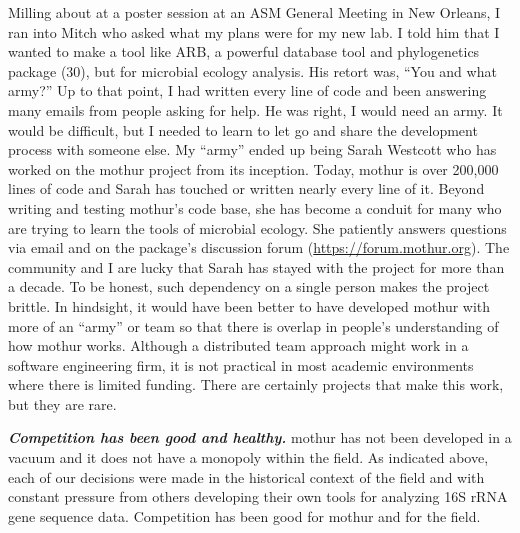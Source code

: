 \documentclass[11pt,]{article}
\begin{document}
Milling about at a poster session at an ASM General Meeting in New
Orleans, I ran into Mitch who asked what my plans were for my new lab. I
told him that I wanted to make a tool like ARB, a powerful database tool
and phylogenetics package (30), but for microbial ecology analysis. His
retort was, ``You and what army?'' Up to that point, I had written every
line of code and been answering many emails from people asking for help.
He was right, I would need an army. It would be difficult, but I needed
to learn to let go and share the development process with someone else.
My ``army'' ended up being Sarah Westcott who has worked on the mothur
project from its inception. Today, mothur is over 200,000 lines of code
and Sarah has touched or written nearly every line of it. Beyond writing
and testing mothur's code base, she has become a conduit for many who
are trying to learn the tools of microbial ecology. She patiently
answers questions via email and on the package's discussion forum
(\url{https://forum.mothur.org}). The community and I are lucky that
Sarah has stayed with the project for more than a decade. To be honest,
such dependency on a single person makes the project brittle. In
hindsight, it would have been better to have developed mothur with more
of an ``army'' or team so that there is overlap in people's
understanding of how mothur works. Although a distributed team approach
might work in a software engineering firm, it is not practical in most
academic environments where there is limited funding. There are
certainly projects that make this work, but they are rare.

\textbf{\emph{Competition has been good and healthy.}} mothur has not
been developed in a vacuum and it does not have a monopoly within the
field. As indicated above, each of our decisions were made in the
historical context of the field and with constant pressure from others
developing their own tools for analyzing 16S rRNA gene sequence data.
Competition has been good for mothur and for the field.
\end{document}
